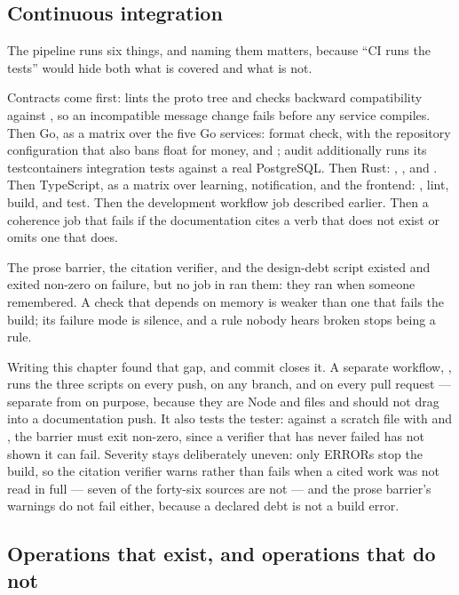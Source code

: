 \subsection{Continuous integration}

The pipeline runs six things, and naming them matters, because \enquote{CI runs the tests} would
hide both what is covered and what is not.

Contracts come first:  lints the proto tree and checks backward compatibility against
, so an incompatible message change fails before any service compiles. Then Go, as a
matrix over the five Go services: format check,  with the repository
configuration that also bans float for money, and ; audit additionally runs its
testcontainers integration tests against a real PostgreSQL. Then Rust: ,
, and . Then TypeScript,
as a matrix over learning, notification, and the frontend: , lint, build, and test. Then
the development workflow job described earlier. Then a coherence job that fails if the documentation
cites a  verb that does not exist or omits one that does.

The prose barrier, the citation verifier, and the
design-debt script existed and exited non-zero on failure, but no job in  ran them: they
ran when someone remembered. A check that depends on memory is weaker than one that fails the build;
its failure mode is silence, and a rule nobody hears broken stops being a rule.

Writing this chapter found that gap, and commit  closes it. A separate workflow,
, runs the three scripts on every push, on any branch, and on
every pull request — separate from  on purpose, because they are Node and files and
should not drag  into a documentation push. It also tests the tester: against a
scratch file with  and , the barrier must exit non-zero, since a
verifier that has never failed has not shown it can fail. Severity stays deliberately uneven: only
ERRORs stop the build, so the citation verifier warns rather than fails when a cited work was not read
in full — seven of the forty-six sources are not — and the prose barrier's warnings do not fail
either, because a declared debt is not a build error.

\subsection{Operations that exist, and operations that do not}

